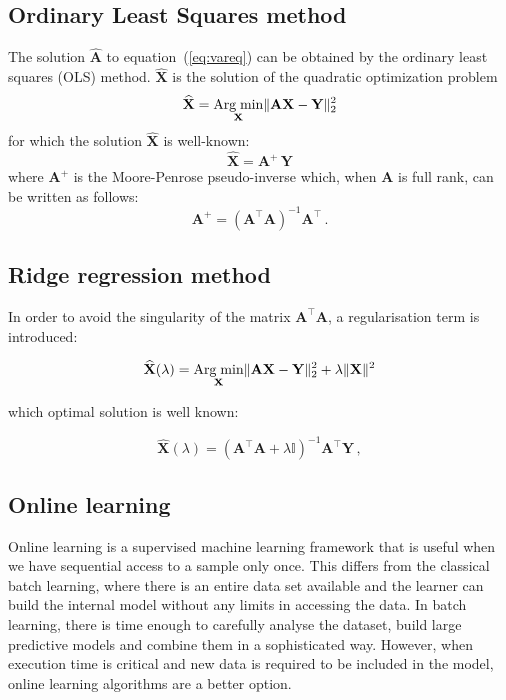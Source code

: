 \documentclass[twocolumn]{svjour3}          %
\begin{document}
\subsection{Ordinary Least Squares method}

The solution $\widehat{\mathbf{A}}$ to
equation~(\ref{eq:vareq}) can be obtained by the ordinary least squares (OLS)
method. $\widehat{\mathbf{X}}$ is the solution of the quadratic optimization problem
\begin{equation*}
\widehat{\mathbf{X}} = \underset{\mathbf{X}}{\text{Arg\;min}}
\|\mathbf{A}\mathbf{X}-\mathbf{Y}\|_2^2
\end{equation*}
\noindent for which the solution $\widehat{\mathbf{X}}$ is well-known:
\begin{equation*}
\label{eq:MP}
\widehat{\mathbf{X}}=\mathbf{A}^{\!\!+}\,\mathbf{Y}
\end{equation*}
\noindent where $\mathbf{A}^{\!\!+}$ is the Moore-Penrose pseudo-inverse
which, when $\mathbf{A}$ is full rank, can be written as follows: 
\begin{equation}
\label{eq:pseudoinverse}
\mathbf{A}^{\!\!+}= (\mathbf{A}^{\!\!\top} \mathbf{A})^{-1}\mathbf{A}^{\!\!\top} \, .
\end{equation}

\subsection{Ridge regression method}

In order to avoid the singularity of the matrix $\mathbf{A}^\top \mathbf{A}$, a regularisation term is introduced: 

\begin{equation}
\label{eq:RRproblem} 
\widehat{\mathbf{X}} (\lambda) = \underset{\mathbf{X}}{\text{Arg\;min}}  \| \mathbf{A}\mathbf{\mathbf{X}} - \mathbf{Y} \|_2^2  + \lambda
 \| \mathbf{\mathbf{X}}\| ^2
\end{equation}

\noindent which optimal solution is well known: 

\begin{equation}
\label{eq:optsolRR}
\widehat{\mathbf{X}} (\lambda)=(\mathbf{A}^\top \mathbf{A}+\lambda \mathbb{I})^{-1}\mathbf{A}^\top \mathbf{Y} \, ,
\end{equation}



\subsection{Online learning}
Online learning is a supervised machine learning framework that is useful when
we have sequential access to a sample only once.  This differs from the
classical batch learning, where there is an entire data set available and the
learner can build the internal model without any limits in accessing the data.
In batch learning, there is time enough to carefully analyse the dataset, build
large predictive models and combine them in a sophisticated way. However, when
execution time is critical and new data is required to be included in the model,
online learning algorithms are a better option.
\end{document}
